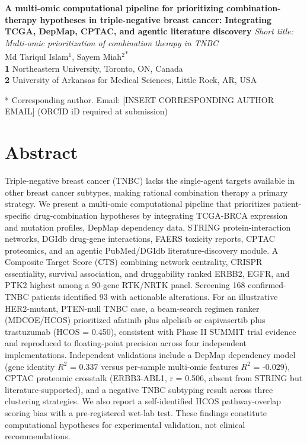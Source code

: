 \documentclass[10pt,letterpaper]{article}
\begin{document}
\vspace*{0.2in}

\begin{flushleft}
{\Large
\textbf{A multi-omic computational pipeline for prioritizing combination-therapy hypotheses in triple-negative breast cancer: Integrating TCGA, DepMap, CPTAC, and agentic literature discovery}
}
\newline
\textit{Short title: Multi-omic prioritization of combination therapy in TNBC}
\\
Md Tariqul Islam$^{1}$, Sayem Miah$^{2}$\textsuperscript{*}
\\
\bigskip
\textbf{1} Northeastern University, Toronto, ON, Canada
\\
\textbf{2} University of Arkansas for Medical Sciences, Little Rock, AR, USA
\\
\bigskip

* Corresponding author. Email: [INSERT CORRESPONDING AUTHOR EMAIL] (ORCID iD required at submission)

\end{flushleft}

\section*{Abstract}
Triple-negative breast cancer (TNBC) lacks the single-agent targets available in other breast cancer subtypes, making rational combination therapy a primary strategy. We present a multi-omic computational pipeline that prioritizes patient-specific drug-combination hypotheses by integrating TCGA-BRCA expression and mutation profiles, DepMap dependency data, STRING protein-interaction networks, DGIdb drug-gene interactions, FAERS toxicity reports, CPTAC proteomics, and an agentic PubMed/DGIdb literature-discovery module. A Composite Target Score (CTS) combining network centrality, CRISPR essentiality, survival association, and druggability ranked ERBB2, EGFR, and PTK2 highest among a 90-gene RTK/NRTK panel. Screening 168 confirmed-TNBC patients identified 93 with actionable alterations. For an illustrative HER2-mutant, PTEN-null TNBC case, a beam-search regimen ranker (MDCOE/HCOS) prioritized afatinib plus alpelisib or capivasertib plus trastuzumab (HCOS = 0.450), consistent with Phase II SUMMIT trial evidence and reproduced to floating-point precision across four independent implementations. Independent validations include a DepMap dependency model (gene identity $R^2$ = 0.337 versus per-sample multi-omic features $R^2$ = -0.029), CPTAC proteomic crosstalk (ERBB3-ABL1, r = 0.506, absent from STRING but literature-supported), and a negative TNBC subtyping result across three clustering strategies. We also report a self-identified HCOS pathway-overlap scoring bias with a pre-registered wet-lab test. These findings constitute computational hypotheses for experimental validation, not clinical recommendations.
\end{document}
